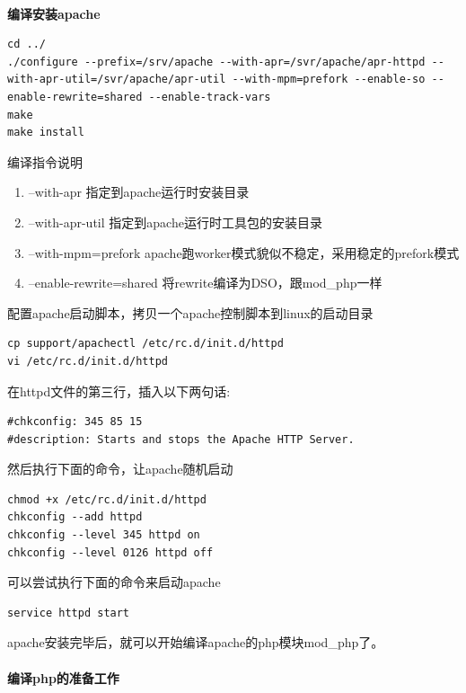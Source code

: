 \documentclass{article}
\begin{document}
\paragraph{}\textbf{编译安装apache}\\

\begin{verbatim}
cd ../
./configure --prefix=/srv/apache --with-apr=/svr/apache/apr-httpd --with-apr-util=/svr/apache/apr-util --with-mpm=prefork --enable-so --enable-rewrite=shared --enable-track-vars
make
make install
\end{verbatim}
编译指令说明

\begin{enumerate}
\item --with-apr                                指定到apache运行时安装目录
\item --with-apr-util                        指定到apache运行时工具包的安装目录
\item --with-mpm=prefork            apache跑worker模式貌似不稳定，采用稳定的prefork模式
\item --enable-rewrite=shared     将rewrite编译为DSO，跟mod\_php一样       
\end{enumerate}

配置apache启动脚本，拷贝一个apache控制脚本到linux的启动目录

\begin{verbatim}
cp support/apachectl /etc/rc.d/init.d/httpd
vi /etc/rc.d/init.d/httpd
\end{verbatim}
在httpd文件的第三行，插入以下两句话:

\begin{verbatim}
#chkconfig: 345 85 15
#description: Starts and stops the Apache HTTP Server.
\end{verbatim}
然后执行下面的命令，让apache随机启动

\begin{verbatim}
chmod +x /etc/rc.d/init.d/httpd
chkconfig --add httpd
chkconfig --level 345 httpd on
chkconfig --level 0126 httpd off
\end{verbatim}
可以尝试执行下面的命令来启动apache

\begin{verbatim}
service httpd start
\end{verbatim}

apache安装完毕后，就可以开始编译apache的php模块mod\_php了。

\paragraph{}\textbf{编译php的准备工作}\\
\end{document}
